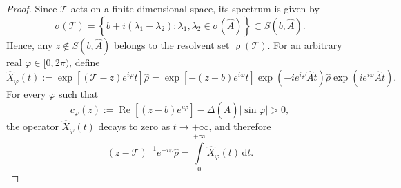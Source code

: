\documentclass{SciPost}
\renewcommand{\Re}{\operatorname{Re}}
\begin{document}
\begin{proof}
    Since $\mathcal T$ acts on a finite-dimensional space, its spectrum is given by
    \begin{equation}
        \sigma(\mathcal T) = \left\{
            b + i (\lambda_1 - \lambda_2) : \lambda_1, \lambda_2 \in \sigma\left(\hat A\right)
        \right\} \subset S\left(b, \hat A\right).
    \end{equation}
    Hence, any \(z \notin S\left(b,\hat A\right)\) belongs to the resolvent set $\varrho(\mathcal T)$. For an arbitrary real \(\varphi \in [0,2\pi)\), define
    \begin{equation}
        \hat X_\varphi(t)
        :=
        \exp\left[(\mathcal T - z) e^{i \varphi} t \right] \hat \rho = 
        \exp\left[
            -(z-b)e^{i\varphi} t
        \right]
        \exp\left(
            -i e^{i\varphi} \hat A t
        \right)
        \hat \rho
        \exp\left(
            i e^{i\varphi} \hat A t
        \right).
    \end{equation}
    For every \(\varphi\) such that
    \begin{equation}
        c_\varphi(z)
        :=
        \Re\left[(z-b)e^{i\varphi}\right]
        -
        \Delta(\hat A)\left|\sin\varphi\right|
        >
        0,
        \label{eq:cphi-positive}
    \end{equation}
    the operator \(\hat X_\varphi(t)\) decays to zero as \(t \to +\infty\), and therefore
    \begin{equation}
        (z-\mathcal T)^{-1} e^{-i\varphi} \hat \rho
        =
        \int\limits_0^{+\infty} \hat X_\varphi(t)\,\mathrm d t.
        \label{eq:resolvent-rotated-integral}
    \end{equation}


\end{proof}
\end{document}

